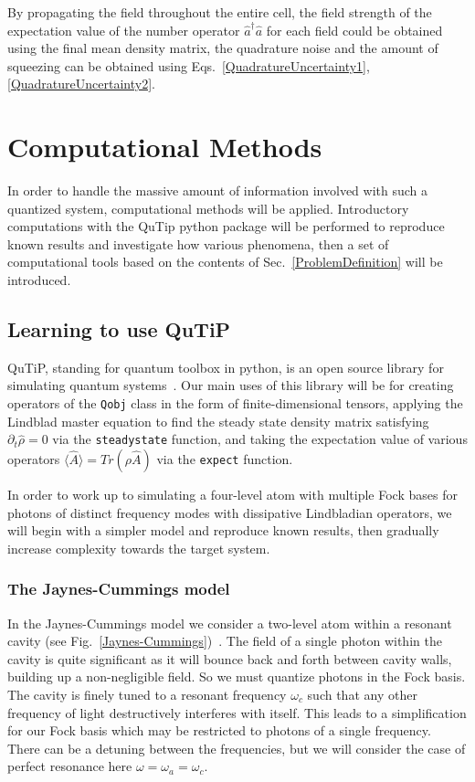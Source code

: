 \documentclass[aps,pra,showpacs,amsmath,amssymb,nofootinbib,longbibliography,superscriptaddress
]{revtex4-1}
\theoremstyle{definition}
\theoremstyle{remark}
\newcommand{\0}{\hat{0}}
\begin{document}
By propagating the field throughout the entire cell, the field strength of the expectation value of the number operator $\hat{a}^{\dagger} \hat{a}$ for each field could be obtained using the final mean density matrix, the quadrature noise and the amount of squeezing can be obtained using Eqs.~\eqref{QuadratureUncertainty1},\eqref{QuadratureUncertainty2}.

\section{Computational Methods}\label{ComputationalMethods}

In order to handle the massive amount of information involved with such a quantized system, computational methods will be applied. Introductory computations with the QuTip python package will be performed to reproduce known results and investigate how various phenomena, then a set of computational tools based on the contents of Sec.~\ref{ProblemDefinition} will be introduced.


\subsection{Learning to use QuTiP}

QuTiP, standing for quantum toolbox in python, is an open source library for simulating quantum systems~\cite{QuTiP}. Our main uses of this library will be for creating operators of the \lstinline|Qobj| class in the form of finite-dimensional tensors, applying the Lindblad master equation to find the steady state density matrix satisfying $\partial_t \hat{\rho} = 0$ via the \lstinline|steadystate| function, and taking the expectation value of various operators $\langle \hat{A} \rangle = Tr(\rho \hat{A})$ via the \lstinline|expect| function.

In order to work up to simulating a four-level atom with multiple Fock bases for photons of distinct frequency modes with dissipative Lindbladian operators, we will begin with a simpler model and reproduce known results, then gradually increase complexity towards the target system.

\subsubsection{The Jaynes-Cummings model}

In the Jaynes-Cummings model we consider a two-level atom within a resonant cavity (see Fig.~\ref{Jaynes-Cummings})~\cite{Tong}. The field of a single photon within the cavity is quite significant as it will bounce back and forth between cavity walls, building up a non-negligible field. So we must quantize photons in the Fock basis. The cavity is finely tuned to a resonant frequency $\omega_c$ such that any other frequency of light destructively interferes with itself. This leads to a simplification for our Fock basis which may be restricted to photons of a single frequency. There can be a detuning between the frequencies, but we will consider the case of perfect resonance here $\omega = \omega_a = \omega_c$.
\end{document}
